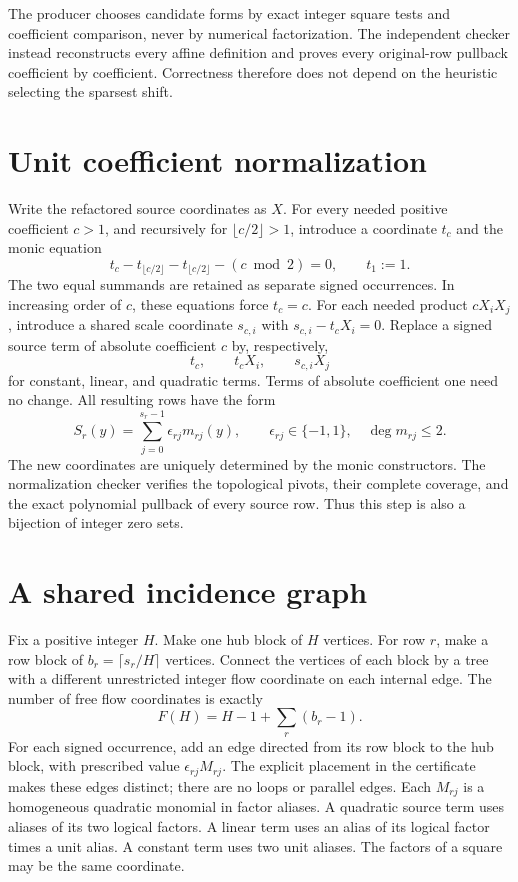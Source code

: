 The producer chooses candidate forms by exact integer square tests and
coefficient comparison, never by numerical factorization. The independent
checker instead reconstructs every affine definition and proves every
original-row pullback coefficient by coefficient. Correctness therefore
does not depend on the heuristic selecting the sparsest shift.

\section{Unit coefficient normalization}
Write the refactored source coordinates as \(X\). For every needed positive
coefficient \(c>1\), and recursively for \(\lfloor c/2\rfloor>1\),
introduce a coordinate \(t_c\) and the monic equation
\[
 t_c-t_{\lfloor c/2\rfloor}-t_{\lfloor c/2\rfloor}
       -(c\bmod 2)=0,
 \qquad t_1:=1.
\]
The two equal summands are retained as separate signed occurrences. In
increasing order of \(c\), these equations force \(t_c=c\). For each
needed product \(cX_iX_j\), introduce a shared scale coordinate
\(s_{c,i}\) with \(s_{c,i}-t_cX_i=0\). Replace a signed source term of
absolute coefficient \(c\) by, respectively,
\[
  t_c,\qquad t_cX_i,\qquad s_{c,i}X_j
\]
for constant, linear, and quadratic terms. Terms of absolute coefficient
one need no change. All resulting rows have the form
\[
 S_r(y)=\sum_{j=0}^{s_r-1}\epsilon_{rj}m_{rj}(y),
 \qquad \epsilon_{rj}\in\{-1,1\},\quad \deg m_{rj}\leq2.
\]
The new coordinates are uniquely determined by the monic constructors.
The normalization checker verifies the topological pivots, their complete
coverage, and the exact polynomial pullback of every source row. Thus this
step is also a bijection of integer zero sets.

\section{A shared incidence graph}
Fix a positive integer \(H\). Make one hub block of \(H\) vertices. For
row \(r\), make a row block of \(b_r=\lceil s_r/H\rceil\) vertices.
Connect the vertices of each block by a tree with a different unrestricted
integer flow coordinate on each internal edge. The number of free flow
coordinates is exactly
\[
 F(H)=H-1+\sum_r(b_r-1).
\]
For each signed occurrence, add an edge directed from its row block to
the hub block, with prescribed value \(\epsilon_{rj}M_{rj}\).
The explicit placement in the certificate makes these edges distinct;
there are no loops or parallel edges. Each \(M_{rj}\) is a homogeneous
quadratic monomial in factor aliases. A quadratic source term uses aliases
of its two logical factors. A linear term uses an alias of its logical
factor times a unit alias. A constant term uses two unit aliases. The
factors of a square may be the same coordinate.

